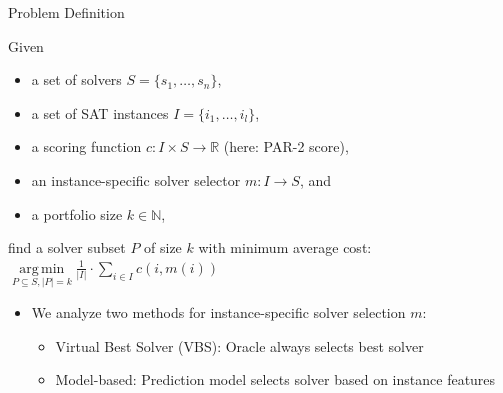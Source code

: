 \documentclass[en]{sdqbeamer}
\DeclareMathOperator*{\argmin}{arg\,min}
\begin{document}
\begin{frame}[t]{Problem Definition}
	\begin{definition}
		\setlength{\leftmargini}{0.4cm} %
		\pause
		Given
		\begin{itemize}
			\itemsep0em
			\item a set of solvers $S = \{s_1, \dots, s_n\}$,
			\pause
			\item a set of SAT instances $I = \{i_1, \dots, i_l\}$,
			\pause
			\item a scoring function $c: I \times S \rightarrow \mathbb{R}$ (here: PAR-2 score),
			\pause
			\item an instance-specific solver selector $m: I \rightarrow S$, and
			\pause
			\item a portfolio size $k \in \mathbb{N}$,
			\pause
		\end{itemize}
		find a solver subset $P$ of size $k$ with minimum average cost: $\argmin\limits_{P \subseteq S, |P| = k} \frac{1}{|I|} \cdot \sum\limits_{i \in I}{c(i,m(i))}$
	\end{definition}
	\pause
	\begin{itemize}
		\item We analyze two methods for instance-specific solver selection $m$:
		\begin{itemize}
			\item Virtual Best Solver (VBS): Oracle always selects best solver
			\pause
			\item Model-based: Prediction model selects solver based on instance features
		\end{itemize}
	\end{itemize}
\end{frame}
\end{document}
